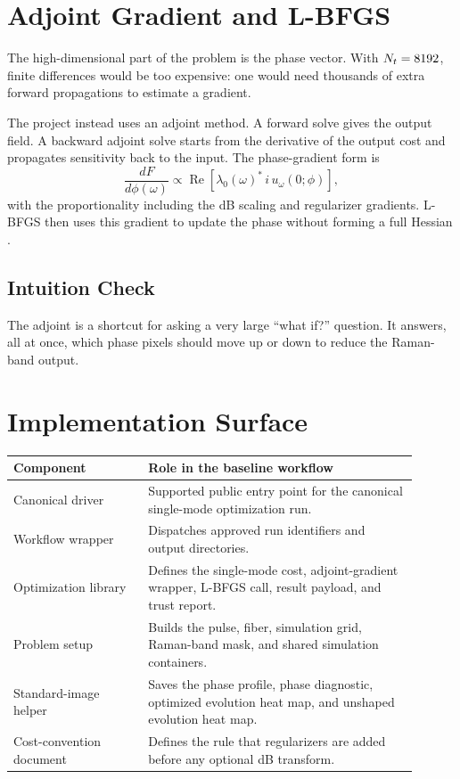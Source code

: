 \documentclass[11pt]{article}
\begin{document}
\section{Adjoint Gradient and L-BFGS}

The high-dimensional part of the problem is the phase vector. With
\(N_t=8192\), finite differences would be too expensive: one would need
thousands of extra forward propagations to estimate a gradient.

The project instead uses an adjoint method. A forward solve gives the output
field. A backward adjoint solve starts from the derivative of the output cost
and propagates sensitivity back to the input. The phase-gradient form is
\[
    \frac{d F}{d \phi(\omega)}
    \propto
    \operatorname{Re}\!\left[
    \lambda_0(\omega)^\ast\, i\,u_\omega(0;\phi)
    \right],
\]
with the proportionality including the dB scaling and regularizer gradients.
L-BFGS then uses this gradient to update the phase without forming a full
Hessian \cite{liu1989,nocedal2006}.

\subsection*{Intuition Check}

The adjoint is a shortcut for asking a very large ``what if?'' question. It
answers, all at once, which phase pixels should move up or down to reduce the
Raman-band output.

\section{Implementation Surface}

\begin{center}
\small
\begin{tabular}{>{\raggedright\arraybackslash}p{0.30\linewidth}
                >{\raggedright\arraybackslash}p{0.60\linewidth}}
\toprule
\textbf{Component} & \textbf{Role in the baseline workflow} \\
\midrule
Canonical driver & Supported public entry point for the canonical single-mode
optimization run. \\
Workflow wrapper & Dispatches approved run identifiers and output directories. \\
Optimization library & Defines the single-mode cost, adjoint-gradient wrapper,
L-BFGS call, result payload, and trust report. \\
Problem setup & Builds the pulse, fiber, simulation grid, Raman-band mask, and
shared simulation containers. \\
Standard-image helper & Saves the phase profile, phase diagnostic, optimized
evolution heat map, and unshaped evolution heat map. \\
Cost-convention document & Defines the rule that regularizers are added before
any optional dB transform. \\
\bottomrule
\end{tabular}
\end{center}
\end{document}
